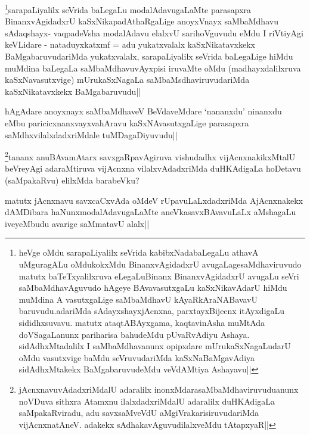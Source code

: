 \begin{artha}
\footnote{heVge oMdu sarapaLiyalilx seVrida kabibxNadabaLegaLu athavA uMguragALu  oMdukokxMdu BinanxvAgidadxrU avugaLagesaMdhaviruvudo matutx baTeTxyalilxruva eLegaLuBinanx BinanxvAgidadxrU avugaLu seVri saMbaMdhavAguvudo hAgeye BAvavasutxgaLu kaSxNikavAdarU hiMdu muMdina A vasutxgaLige saMbaMdhavU kAyaRkAraNABavavU baruvudu.adariMda sAdayxshayxjAcnxna, parxtayxBijecnx itAyxdigaLu sididhxsuvavu. matutx ataqtABAyxgama, kaqtavinAsha muMtAda doVSagaLanunx pariharisa bahudeMdu pUvaRvAdiyu Ashaya. sidAdhxMtadalilx I saMbaMdhavanunx opipxdare mUrukaSxNagaLudarU oMdu vasutxvige  baMdu seVruvudariMda kaSxNaBaMgavAdiya sidAdhxMtakekx BaMgabaruvudeMdu veVdAMtiya Ashayavu||}sarapaLiyalilx seVrida baLegaLu modalAdavugaLaMte parasapxra BinanxvAgidadxrU kaSxNikapadAthaRgaLige anoyxVnayx saMbaMdhavu sAdaqshayx- vaqpadeVsha modalAdavu elalxvU sarihoVguvudu eMdu I riVtiyAgi keVLidare - nataduyxkatxmf = adu yukatxvalalx kaSxNikatavxkekx BaMgabaruvudariMda yukatxvalalx, sarapaLiyalilx seVrida baLegaLige hiMdu muMdina baLegaLa saMbaMdhavuvAyxpisi iruvaMte oMdu (madhayxdalilxruva kaSxNavasutxvige) mUrukaSxNagaLa saMbaMsdhaviruvudariMda kaSxNikatavxkekx BaMgabaruvudu||
\end{artha}

\begin{artha}
hAgAdare anoyxnayx saMbaMdhaveV BeVdaveMdare `nananxdu' ninanxdu eMbu paricicxnanxvayxvahAravu kaSxNAvasutxgaLige parasapxra saMdhxvilalxdadxriMdale tuMDagaDiyuvudu||
\end{artha}

\begin{artha}
\footnote{jAcnxnavuvAdadxriMdalU adaralilx inonxMdarasaMbaMdhaviruvuduanunx noVDuva sithxra Atamxnu ilalxdadxriMdalU adaralilx duHKAdigaLa saMpakaRviradu, adu savxsaMveVdU aMgiVrakarisiruvudariMda vijAcnxnatAneV. adakekx sAdhakavAguvudilalxveMdu tAtapxyaR||}tananx anuBAvamAtarx savxgaRpavAgiruva vishudadhx vijAcnxnakikxMtalU beVreyAgi adaraMtiruva vijAcnxna vilalxvAdadxriMda duHKAdigaLa hoDetavu (saMpakaRvu) elilxMda barabeVku?
\end{artha}

\begin{artha}
matutx jAcnxnavu savxcaCxvAda oMdeV rUpavuLaLxdadxriMda AjAcnxnakekx dAMDibara haNunxmodalAdavugaLaMte aneVkasavxBAvavuLaLx aMshagaLu iveyeMbudu avarige saMmatavU alalx||
\end{artha}

